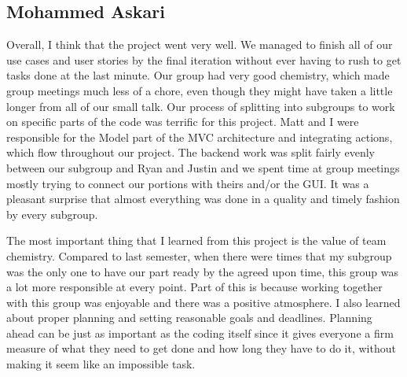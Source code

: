 \documentclass{hitec}
\begin{document}
\subsection{Mohammed Askari}
Overall, I think that the project went very well. We managed to finish all of our use cases and user stories by the final iteration without ever having to rush to get tasks done at the last minute. Our group had very good chemistry, which made group meetings much less of a chore, even though they might have taken a little longer from all of our small talk. Our process of splitting into subgroups to work on specific parts of the code was terrific for this project. Matt and I were responsible for the Model part of the MVC architecture and integrating actions, which flow throughout our project. The backend work was split fairly evenly between our subgroup and Ryan and Justin and we spent time at group meetings mostly trying to connect our portions with theirs and/or the GUI. It was a pleasant surprise that almost everything was done in a quality and timely fashion by every subgroup.

The most important thing that I learned from this project is the value of team chemistry. Compared to last semester, when there were times that my subgroup was the only one to have our part ready by the agreed upon time, this group was a lot more responsible at every point. Part of this is because working together with this group was enjoyable and there was a positive atmosphere. I also learned about proper planning and setting reasonable goals and deadlines. Planning ahead can be just as important as the coding itself since it gives everyone a firm measure of what they need to get done and how long they have to do it, without making it seem like an impossible task.
\end{document}
